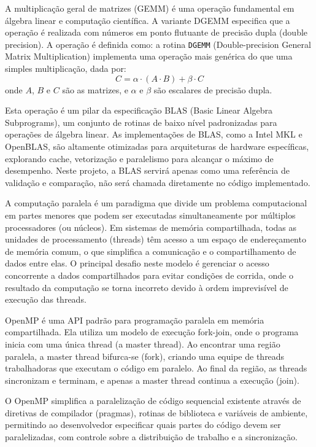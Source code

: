 \documentclass[12pt, a4paper]{article}
\begin{document}
	A multiplicação geral de matrizes (GEMM) é uma operação fundamental em álgebra linear e computação científica. A variante DGEMM especifica que a operação é realizada com números em ponto flutuante de precisão dupla (double precision). A operação é definida como: a rotina \texttt{DGEMM} (Double-precision General Matrix Multiplication) implementa uma operação mais genérica do que uma simples multiplicação, dada por:
	\[
		C = \alpha \cdot (A \cdot B) + \beta \cdot C
	\]
	onde $A$, $B$ e $C$ são as matrizes, e $\alpha$ e $\beta$ são escalares de precisão dupla.

	Esta operação é um pilar da especificação BLAS (Basic Linear Algebra Subprograms), um conjunto de rotinas de baixo nível padronizadas para operações de álgebra linear. As implementações de BLAS, como a Intel MKL e OpenBLAS, são altamente otimizadas para arquiteturas de hardware específicas, explorando cache, vetorização e paralelismo para alcançar o máximo de desempenho. Neste projeto, a BLAS servirá apenas como uma referência de validação e comparação, não será chamada diretamente no código implementado.

	A computação paralela é um paradigma que divide um problema computacional em partes menores que podem ser executadas simultaneamente por múltiplos processadores (ou núcleos). Em sistemas de memória compartilhada, todas as unidades de processamento (threads) têm acesso a um espaço de endereçamento de memória comum, o que simplifica a comunicação e o compartilhamento de dados entre elas. O principal desafio neste modelo é gerenciar o acesso concorrente a dados compartilhados para evitar condições de corrida, onde o resultado da computação se torna incorreto devido à ordem imprevisível de execução das threads.

	OpenMP é uma API padrão para programação paralela em memória compartilhada. Ela utiliza um modelo de execução fork-join, onde o programa inicia com uma única thread (a master thread). Ao encontrar uma região paralela, a master thread bifurca-se (fork), criando uma equipe de threads trabalhadoras que executam o código em paralelo. Ao final da região, as threads sincronizam e terminam, e apenas a master thread continua a execução (join).

	O OpenMP simplifica a paralelização de código sequencial existente através de diretivas de compilador (pragmas), rotinas de biblioteca e variáveis de ambiente, permitindo ao desenvolvedor especificar quais partes do código devem ser paralelizadas, com controle sobre a distribuição de trabalho e a sincronização.
\end{document}
